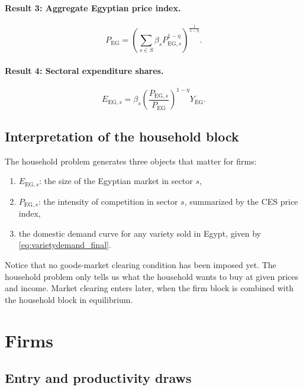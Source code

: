 \documentclass[11pt]{article}
\begin{document}
\paragraph{Result 3: Aggregate Egyptian price index.}
\begin{equation}
P_{\mathrm{EG}}=\left(\sum_{s\in S}\beta_sP_{\mathrm{EG},s}^{1-\eta}\right)^{\frac{1}{1-\eta}}.
\label{eq:aggregate_price_final}
\end{equation}

\paragraph{Result 4: Sectoral expenditure shares.}
\begin{equation}
E_{\mathrm{EG},s}=\beta_s\left(\frac{P_{\mathrm{EG},s}}{P_{\mathrm{EG}}}\right)^{1-\eta}Y_{\mathrm{EG}}.
\end{equation}

\subsection{Interpretation of the household block}

The household problem generates three objects that matter for firms:
\begin{enumerate}[leftmargin=*]
    \item \(E_{\mathrm{EG},s}\): the size of the Egyptian market in sector \(s\),
    \item \(P_{\mathrm{EG},s}\): the intensity of competition in sector \(s\), summarized by the CES price index,
    \item the domestic demand curve for any variety sold in Egypt, given by \eqref{eq:varietydemand_final}.
\end{enumerate}

Notice that no goods-market clearing condition has been imposed yet. The household problem only tells us what the household wants to buy at given prices and income. Market clearing enters later, when the firm block is combined with the household block in equilibrium.

\section{Firms}

\subsection{Entry and productivity draws}
\end{document}
